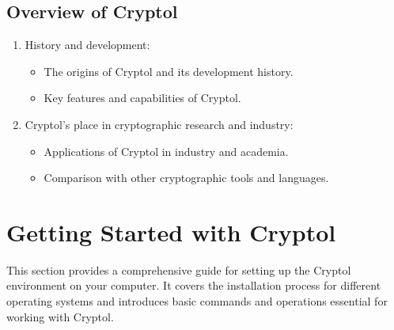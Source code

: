 \subsection{Overview of Cryptol}
\begin{enumerate}
	\item History and development:
	\begin{itemize}
		\item The origins of Cryptol and its development history.
		\item Key features and capabilities of Cryptol.
	\end{itemize}
	\item Cryptol's place in cryptographic research and industry:
	\begin{itemize}
		\item Applications of Cryptol in industry and academia.
		\item Comparison with other cryptographic tools and languages.
	\end{itemize}
\end{enumerate}

\newpage
\section{Getting Started with Cryptol}
This section provides a comprehensive guide for setting up the Cryptol environment on your computer. It covers the installation process for different operating systems and introduces basic commands and operations essential for working with Cryptol.
